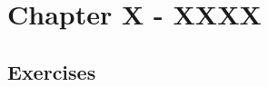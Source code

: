 
\newpage
\section{Chapter X - XXXX}

\subsection*{Exercises}







\begin{comment}

    \bigskip\noindent
    \textbf{3.2X}\\  %
    
    
    \begin{align*}
        A &= B
    \end{align*}
    
    
    \begin{equation*}
        A = B
        \tag*{\qed}
    \end{equation*}
    
    
    \begin{lstlisting}[style=RSyntax, title=R]
    # Code
    \end{lstlisting}
    
    \begin{verbatim}
    # Output
    \end{verbatim}
    
    
    
    
    
    
    \begin{figure}[H]
        \begin{minipage}{0.5\textwidth}
        \end{minipage}
        \begin{minipage}{0.5\textwidth}
        \end{minipage}
    \end{figure}
    

\end{comment}
